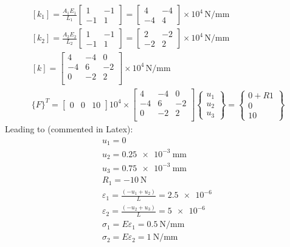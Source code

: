 \documentclass[class=report, crop=false, 12pt,a4paper]{standalone}
\begin{document}
\begin{gather}
	\left[k_1\right] = \frac{A_1E_1}{L_1} \begin{bmatrix}
		1 & -1\\
		-1 & 1
	\end{bmatrix} = \begin{bmatrix}
		4 & -4\\
		-4 & 4
	\end{bmatrix}\times 10^4\, \si{\newton\per\milli\meter}\\
	\left[k_2\right] = \frac{A_2E_2}{L_2} \begin{bmatrix}
		1 & -1\\
		-1 & 1
	\end{bmatrix} = \begin{bmatrix}
		2 & -2\\
		-2 & 2
	\end{bmatrix}\times 10^4\, \si{\newton\per\milli\meter}\\
	\left[k\right] = \begin{bmatrix}
		4 & -4 & 0\\
		-4 & 6 & -2\\
		0 & -2 & 2\\
	\end{bmatrix}\times 10^4\, \si{\newton\per\milli\meter}\\
	\{F\}^T = \begin{bmatrix}
		0 & 0 & 10
	\end{bmatrix}
	10^4\times\begin{bmatrix}
		4 & -4 & 0\\
		-4 & 6 & -2\\
		0 & -2 & 2\\
	\end{bmatrix}\begin{Bmatrix}
		u_1\\
		u_2\\
		u_3
	\end{Bmatrix} = \begin{Bmatrix}
		0 + R1\\
		0\\
		10
	\end{Bmatrix}
\end{gather}
Leading to (commented in Latex):
\begin{gather}
	u_1 = 0\\
	u_2 = \SI{0.25e-3}{\milli\meter}\\
	u_3 = \SI{0.75e-3}{\milli\meter}\\
	R_1 = \SI{-10}{\newton}\\
	\varepsilon_1 = \frac{\left(-u_1+u_2\right)}{L} = \SI{2.5e-6}{}\\
	\varepsilon_2 = \frac{\left(-u_2+u_3\right)}{L} = \SI{5e-6}{}\\
	\sigma_1 = E\varepsilon_1 = \SI{0.5}{\newton\per\milli\meter}\\
	\sigma_2 = E\varepsilon_2 = \SI{1}{\newton\per\milli\meter}
\end{gather}
\end{document}
